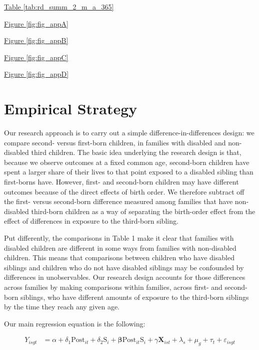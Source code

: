 \hyperref[tab:rd_summ_2_m_a_365]{Table \ref{tab:rd_summ_2_m_a_365}}

\hyperref[fig:fig_appA]{Figure \ref{fig:fig_appA}}

\hyperref[fig:fig_appB]{Figure \ref{fig:fig_appB}}

\hyperref[fig:fig_appC]{Figure \ref{fig:fig_appC}}

\hyperref[fig:fig_appD]{Figure \ref{fig:fig_appD}}



\section{Empirical Strategy}\label{sec:empirical_strategy}

Our research approach is to carry out a simple difference-in-differences design: we compare second- versus first-born children, in families with disabled and non-disabled third children. The basic idea underlying the research design is that, because we observe outcomes at a fixed common age, second-born children have spent a larger share of their lives to that point exposed to a disabled sibling than first-borns have. However, first- and second-born children may have different outcomes because of the direct effects of birth order. We therefore subtract off the first- versus second-born difference measured among families that have non-disabled third-born children as a way of separating the birth-order effect from the effect of differences in exposure to the third-born sibling. 

Put differently, the comparisons in Table 1 make it clear that families with disabled children are different in some ways from families with non-disabled children. This means that comparisons between children who have disabled siblings and children who do not have disabled siblings may be confounded by differences in unobservables. Our research design accounts for those differences across families by making comparisons within families, across first- and second-born siblings, who have different amounts of exposure to the third-born siblings by the time they reach any given age. 

Our main regression equation is the following:

    \begin{align}
    Y_{isgt} &= \alpha + \delta_1 \text{Post}_{it} + \delta_2 \text{S}_{i}   + \boldsymbol{\beta} \text{Post}_{it} \text{S}_{i}  + \gamma\mathbf{X}_{ist} + \lambda_s + \mu_g + \tau_t + \varepsilon_{isgt}
    \end{align}

